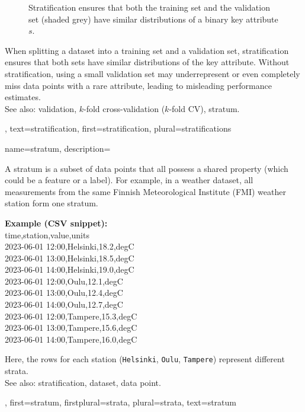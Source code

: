 {{\begin{figure}[H]
 	\caption{Stratification ensures that both the training set and the validation set 
	(shaded grey) have similar 
 		distributions of a binary key attribute $s$.}
 \end{figure}
  When splitting a dataset into a training set and a validation set, 
  stratification ensures that both sets have similar distributions of the key attribute. 
  Without stratification, using a small validation set may underrepresent or 
  even completely miss data points with a rare attribute, leading to misleading 
  performance estimates.\\ 
  See also: validation, $k$-fold cross-validation ($k$-fold CV), stratum.},
  text={stratification},
  first={stratification},
  plural={stratifications}
}

{name={stratum},
	description={
	A stratum is a subset of data points that all 
	possess a shared property (which could be a feature or a label). 
	For example, in a weather dataset, all measurements from the same 
	Finnish Meteorological Institute (FMI) weather station form one stratum.\\[0.5em]
	\begin{center}
\textbf{Example (CSV snippet):}\\
  {\ttfamily
  time,station,value,units\\
  2023-06-01 12:00,Helsinki,18.2,degC\\
  2023-06-01 13:00,Helsinki,18.5,degC\\
  2023-06-01 14:00,Helsinki,19.0,degC\\
  2023-06-01 12:00,Oulu,12.1,degC\\
  2023-06-01 13:00,Oulu,12.4,degC\\
  2023-06-01 14:00,Oulu,12.7,degC\\
  2023-06-01 12:00,Tampere,15.3,degC\\
  2023-06-01 13:00,Tampere,15.6,degC\\
  2023-06-01 14:00,Tampere,16.0,degC
  }
	\end{center} 
	Here, the rows for each station (\texttt{Helsinki}, \texttt{Oulu}, \texttt{Tampere}) 
	represent different strata.\\ 
	See also: stratification, dataset, data point.},
  first={stratum},
  firstplural={strata},
 plural={strata}, 
 text={stratum}
}


